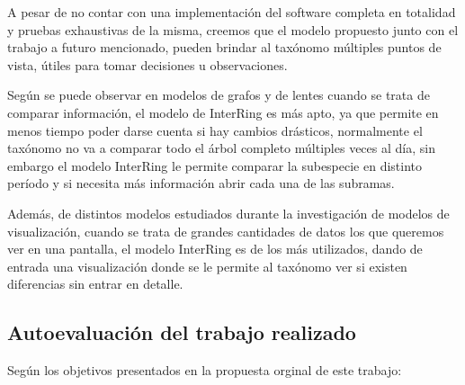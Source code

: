 \documentclass[journal]{IEEEtran}
\begin{document}
A pesar de no contar con una implementación del software completa en totalidad y pruebas exhaustivas de la misma, creemos que el modelo propuesto junto con el trabajo a futuro mencionado, pueden brindar al taxónomo múltiples puntos de vista, útiles para tomar decisiones u observaciones. 

Según se puede observar en modelos de grafos \cite{graph-explore} y de lentes \cite{lens-visual} cuando se trata de comparar información, el modelo de InterRing es más apto, ya que permite en menos tiempo poder darse cuenta si hay cambios drásticos, normalmente el taxónomo no va a comparar todo el árbol completo múltiples veces al día, sin embargo el modelo InterRing le permite comparar la subespecie en distinto período y si necesita más información abrir cada una de las subramas.

Además, de distintos modelos estudiados durante la investigación de modelos de visualización, cuando se trata de grandes cantidades de datos los que queremos ver en una pantalla, el modelo InterRing es de los más utilizados, dando de entrada una visualización donde se le permite al taxónomo ver si existen diferencias sin entrar en detalle.


\subsection{Autoevaluación del trabajo realizado }
Según los objetivos presentados en la propuesta orginal de este trabajo:
\end{document}
